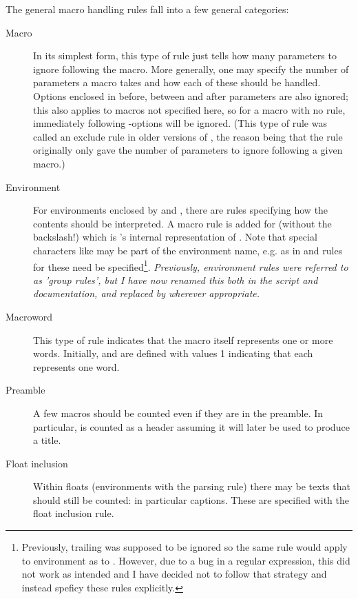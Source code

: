 \documentclass{article}
\begin{document}
The general macro handling rules fall into a few general categories:

\begin{description}

\item[Macro]In its simplest form, this type of rule just tells how many parameters to ignore following the macro. More generally, one may specify the number of parameters a macro takes and how each of these should be handled. Options enclosed in \code{[]} before, between and after parameters are also ignored; this also applies to macros not specified here, so for a macro with no rule, immediately following \code{[]}-options will be ignored. (This type of rule was called an exclude rule in older versions of \TeXcount{}, the reason being that the rule originally only gave the number of
parameters to ignore following a given macro.)

\item[Environment]For environments enclosed by  and , there are rules specifying how the contents should be interpreted. A macro rule is added for  (without the backslash!) which is \TeXcount{}'s internal representation of . Note that special characters like \code{*} may be part of the environment name, e.g. as in  and rules for these need be specified\footnote{Previously, trailing \code{*} was supposed to be ignored so the same rule would apply to environment  as to . However, due to a bug in a regular expression, this did not work as intended and I have decided not to follow that strategy and instead speficy these rules explicitly.}. \emph{Previously, environment rules were referred to as 'group rules', but I have now renamed this both in the \TeXcount{} script and documentation, and replaced  by  wherever appropriate.}

\item[Macroword]This type of rule indicates that the macro itself represents one or more words. Initially,  and  are defined with values 1 indicating that each represents one word.

\item[Preamble]A few macros should be counted even if they are in the preamble. In particular,  is counted as a header assuming it will later be used to produce a title.

\item[Float inclusion]Within floats (environments with the  parsing rule) there may be texts that should still be counted: in particular captions. These are specified with the float inclusion rule.

\end{description}
\end{document}
